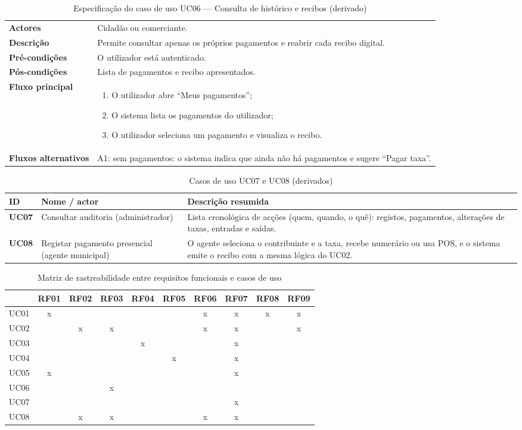 \documentclass[12pt,a4paper,openany]{report}
\makeatletter
\newcommand{\ucspec}[8]{%
\begin{table}[!htbp]
\caption{Especificação do caso de uso #1 --- #2}
\label{tab:#1}
\begingroup\singlespacing\small
\begin{tabularx}{\textwidth}{@{}>{\bfseries}p{3cm}X@{}}
\toprule
Actores & #3 \\
Descrição & #4 \\
Pré-condições & #5 \\
Pós-condições & #6 \\
Fluxo principal & #7 \\
Fluxos alternativos & #8 \\
\bottomrule
\end{tabularx}
\endgroup
\end{table}}
\makeatother
\begin{document}
\ucspec{UC06}{Consulta de histórico e recibos (derivado)}
{Cidadão ou comerciante.}
{Permite consultar apenas os próprios pagamentos e reabrir cada recibo digital.}
{O utilizador está autenticado.}
{Lista de pagamentos e recibo apresentados.}
{\begin{enumerate}[leftmargin=1.2em]
\item O utilizador abre ``Meus pagamentos'';
\item O sistema lista os pagamentos do utilizador;
\item O utilizador seleciona um pagamento e visualiza o recibo.
\end{enumerate}}
{A1: sem pagamentos: o sistema indica que ainda não há pagamentos e sugere ``Pagar taxa''.}

\begin{table}[!htbp]
\caption{Casos de uso UC07 e UC08 (derivados)}\label{tab:UC08}
\begingroup\singlespacing\small
\begin{tabularx}{\textwidth}{@{}>{\bfseries}p{1.6cm}p{3.4cm}X@{}}
\toprule
ID & Nome / actor & Descrição resumida \\
\midrule
UC07 & Consultar auditoria (administrador) & Lista cronológica de acções (quem, quando, o quê): registos, pagamentos, alterações de taxas, entradas e saídas. \\
UC08 & Registar pagamento presencial (agente municipal) & O agente seleciona o contribuinte e a taxa, recebe numerário ou usa POS, e o sistema emite o recibo com a mesma lógica do UC02. \\
\bottomrule
\end{tabularx}
\endgroup
\end{table}

\begin{table}[!htbp]
\caption{Matriz de rastreabilidade entre requisitos funcionais e casos de uso}\label{tab:rastr}
\begingroup\singlespacing\small
\begin{tabular}{@{}lccccccccc@{}}
\toprule
 & RF01 & RF02 & RF03 & RF04 & RF05 & RF06 & RF07 & RF08 & RF09 \\
\midrule
UC01 & x & & & & & x & x & x & x \\
UC02 & & x & x & & & x & x & & x \\
UC03 & & & & x & & & x & & \\
UC04 & & & & & x & & x & & \\
UC05 & x & & & & & & x & & \\
UC06 & & & x & & & & & & \\
UC07 & & & & & & & x & & \\
UC08 & & x & x & & & x & x & & \\
\bottomrule
\end{tabular}
\endgroup
\end{table}
\end{document}
